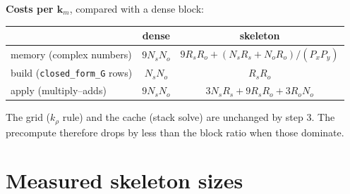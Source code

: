 \documentclass[11pt,a4paper]{article}
\newcommand{\code}[1]{\texttt{#1}}
\newcommand{\km}{\mathbf{k}_m}
\theoremstyle{remark}
\begin{document}
\textbf{Costs per $\km$}, compared with a dense block:
\begin{center}
\begin{tabular}{lcc}
\toprule
 & dense & skeleton \\
\midrule
memory (complex numbers) & $9N_sN_o$ & $9R_sR_o + (N_sR_s + N_oR_o)/(P_xP_y)$ \\
build (\code{closed\_form\_G} rows) & $N_sN_o$ & $R_sR_o$ \\
apply (multiply--adds) & $9N_sN_o$ & $3N_sR_s + 9R_sR_o + 3R_oN_o$ \\
\bottomrule
\end{tabular}
\end{center}
The grid ($k_\rho$ rule) and the cache (stack solve) are unchanged by step 3. The precompute therefore drops by
less than the block ratio when those dominate.

\section{Measured skeleton sizes}
\label{sec:ranks}
\end{document}
